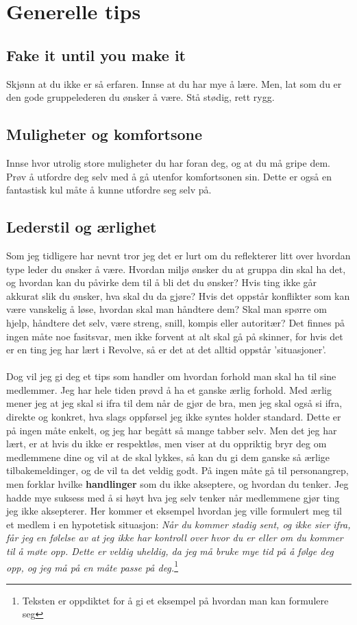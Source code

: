 \section{Generelle tips}
\subsection{Fake it until you make it}
Skjønn at du ikke er så erfaren. Innse at du har mye å lære. Men, lat som du er den gode gruppelederen du ønsker å være. Stå stødig, rett rygg. 
\subsection{Muligheter og komfortsone}
Innse hvor utrolig store muligheter du har foran deg, og at du må gripe dem.  
Prøv å utfordre deg selv med å gå utenfor komfortsonen sin. 
Dette er også en fantastisk kul måte å kunne utfordre seg selv på.

\subsection{Lederstil og ærlighet}
Som jeg tidligere har nevnt tror jeg det er lurt om du reflekterer litt over hvordan type leder du ønsker å være. Hvordan miljø ønsker du at gruppa din skal ha det, og hvordan kan du påvirke dem til å bli det du ønsker? Hvis ting ikke går akkurat slik du ønsker, hva skal du da gjøre? Hvis det oppstår konflikter som kan være vanskelig å løse, hvordan skal man håndtere dem? Skal man spørre om hjelp, håndtere det selv, være streng, snill, kompis eller autoritær? Det finnes på ingen måte noe fasitsvar, men ikke forvent at alt skal gå på skinner, for hvis det er en ting jeg har lært i Revolve, så er det at det alltid oppstår 'situasjoner'.\\
\\
Dog vil jeg gi deg et tips som handler om hvordan forhold man skal ha til sine medlemmer. Jeg har hele tiden prøvd å ha et ganske ærlig forhold. Med ærlig mener jeg at jeg skal si ifra til dem når de gjør de bra, men jeg skal også si ifra, direkte og konkret, hva slags oppførsel jeg ikke syntes holder standard. Dette er på ingen måte enkelt, og jeg har begått så mange tabber selv. Men det jeg har lært, er at hvis du ikke er respektløs, men viser at du oppriktig bryr deg om medlemmene dine og vil at de skal lykkes, så kan du gi dem ganske så ærlige tilbakemeldinger, og de vil ta det veldig godt. På ingen måte gå til personangrep, men forklar hvilke \textbf{handlinger} som du ikke akseptere, og hvordan du tenker. Jeg hadde mye suksess med å si høyt hva jeg selv tenker når medlemmene gjør ting jeg ikke aksepterer. Her kommer et eksempel hvordan jeg ville formulert meg til et medlem i en hypotetisk situasjon: \textit{Når du kommer stadig sent, og ikke sier ifra, får jeg en følelse av at jeg ikke har kontroll over hvor du er eller om du kommer til å møte opp. Dette er veldig uheldig, da jeg må bruke mye tid på å følge deg opp, og jeg må på en måte passe på deg.}\footnote{Teksten er oppdiktet for å gi et eksempel på hvordan man kan formulere seg} \\

